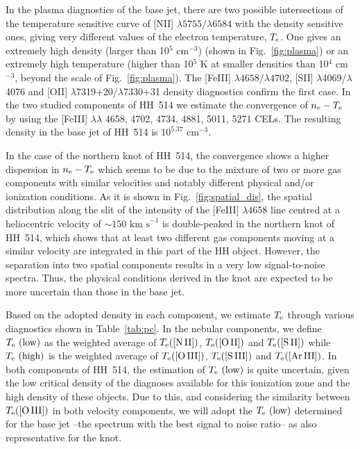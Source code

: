 \documentclass[fleqn,usenatbib]{mnras}
\begin{document}
In the plasma diagnostics of the base jet, there are two possible intersections of the temperature sensitive curve of [N\thinspace II] $\lambda5755/\lambda6584$ with the density sensitive ones, giving very different values of the electron temperature,  $T_{\rm e}$. One gives an extremely high density (larger than 10$^5$ cm$^{-3}$) (shown in Fig.~\ref{fig:plasma}) or an extremely high temperature (higher than 10$^{5}$ K at smaller densities than 10$^{4}$ cm$^{-3}$, beyond the scale of Fig.~\ref{fig:plasma}). The [Fe\thinspace III] $\lambda4658/\lambda4702$, [S\thinspace II] $\lambda$4069/$\lambda$4076 and [O\thinspace II] $\lambda$7319+20/$\lambda$7330+31 density diagnostics confirm the first case. In the two studied components of HH~514 we estimate the convergence of $n_{\rm e}-T_{\rm e}$ by using the [Fe\thinspace III] $\lambda \lambda$ 4658, 4702, 4734, 4881, 5011, 5271 CELs. The resulting density in the base jet of HH~514 is $10^{5.37} \text{ cm}^{-3}$. 

In the case of the northern knot of HH~514, the convergence shows a higher dispersion in $n_{\rm e}-T_{\rm e}$ which seems to be due to the mixture of two or more gas components with similar velocities and notably different physical and/or ionization conditions. As it is shown in Fig.~\ref{fig:spatial_dis}, the spatial distribution along the slit of the intensity of the  [Fe\thinspace III] $\lambda 4658$ line centred at a heliocentric velocity of $\sim 150 \text{ km s}^{-1}$ is double-peaked in the northern knot of HH~514, which shows that at least two different gas components moving at a similar velocity are integrated in this part of the HH object. However, the separation into two spatial components results in a very low signal-to-noise spectra. Thus, the physical conditions derived in the knot are expected to be more uncertain than those in the base jet.

Based on the adopted density in each component, we estimate $T_{\rm e}$ through various diagnostics shown in Table~\ref{tab:pc}. In the nebular components, we define $T_{\rm e} \text{ (low)}$ as the weighted average of $T_{\rm e} (\text{[N\thinspace II]})$, $T_{\rm e} (\text{[O\thinspace II]})$ and $T_{\rm e} (\text{[S\thinspace II]})$ while $T_{\rm e} \text{ (high)}$ is the weighted average of $T_{\rm e} (\text{[O\thinspace III]})$, $T_{\rm e} (\text{[S\thinspace III]})$ and $T_{\rm e} (\text{[Ar\thinspace III]})$. In both components of HH~514, the estimation of $T_{\rm e} \text{ (low)}$ is quite uncertain, given the low critical density of the diagnoses available for this ionization zone and the high density of these objects. Due to this, and considering the similarity between $T_{\rm e}(\text{[O\thinspace III]})$ in both velocity components, we will adopt the $T_{\rm e} \text{ (low)}$ determined for the base jet --the spectrum with the best signal to noise ratio-- as also representative for the knot.
\end{document}
